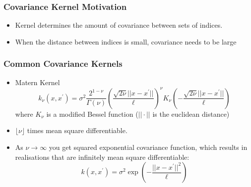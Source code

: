 \documentclass{beamer}
\begin{document}
\begin{frame}
    \frametitle{Covariance Kernel Motivation}\begin{itemize}
        \item Kernel determines the amount of covariance between sets of indices.
        \item When the distance between indices is small, covariance needs to be large
    \end{itemize}
\end{frame}

\begin{frame}
    \frametitle{Common Covariance Kernels}\begin{itemize}
        \item Matern Kernel
              $$k_\nu(x, x^\prime)
                  = \sigma^2\frac{2^{1 - \nu}}{\Gamma(\nu)}
                  \left(\frac{\sqrt{2\nu}||x - x^\prime||}{\ell}\right)^\nu
                  K_\nu\left(-\frac{\sqrt{2\nu}||x - x^\prime||}{\ell}\right)$$ where $K_\nu$ is a modified Bessel function ($||\cdot||$ is the euclidean distance)
        \item $\lfloor{\nu}\rfloor$ times mean square differentiable.
        \item As $\nu\to\infty$ you get squared exponential covariance function, which results in realisations that are infinitely mean square differentiable:
              $$k(x, x^\prime) = \sigma^2\exp(-\frac{||x - x^\prime||^2}{\ell})$$
    \end{itemize}
\end{frame}
\end{document}
